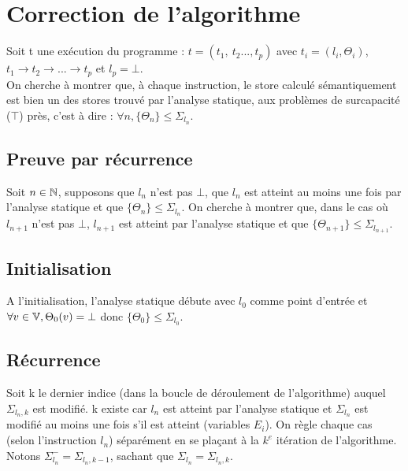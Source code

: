 \section{Correction de l'algorithme}
Soit t une exécution du programme : $t=(t_1,\ t_2..., t_p)$ avec $t_i=(l_i, \Theta_i)$, $t_1\longrightarrow t_2\longrightarrow ...\longrightarrow t_p$ et $l_p = \bot$.\\
On cherche à montrer que, à chaque instruction, le store calculé sémantiquement est bien un des stores trouvé par l'analyse statique, aux problèmes de surcapacité ($\top$) près, c'est à dire : $\forall n, \{\Theta_n\}\leq\Sigma_{l_n}$.


\subsection{Preuve par récurrence}
Soit $n\in \mathbb N$, supposons que $l_n$ n'est pas $\bot$, que $l_n$ est atteint au moins une fois par l'analyse statique et que $\{\Theta_n\}\leq\Sigma_{l_n}$. On cherche à montrer que, dans le cas où $l_{n+1}$ n'est pas $\bot$, $l_{n+1}$ est atteint par l'analyse statique et que $\{\Theta_{n+1}\}\leq\Sigma_{l_{n+1}}$.
\subsection{Initialisation}
A l'initialisation, l'analyse statique débute avec $l_0$ comme point d'entrée et $\forall v\in\mathbb V, \Theta_0(v)=\bot$ donc $\{\Theta_0\}\leq\Sigma_{l_0}$.
\subsection{Récurrence}
Soit k le dernier indice (dans la boucle de déroulement de l'algorithme) auquel $\Sigma_{{l_n},k}$ est modifié. k existe car $l_n$ est atteint par l'analyse statique et $\Sigma_{l_n}$ est modifié au moins une fois s'il est atteint (variables $E_i$). On règle chaque cas (selon l'instruction $l_n$) séparément en se plaçant à la $k^e$ itération de l'algorithme.\\
Notons $\Sigma^{-}_{l_n}=\Sigma_{{l_n},k-1}$, sachant que $\Sigma_{l_n}=\Sigma_{{l_n},k}$.

